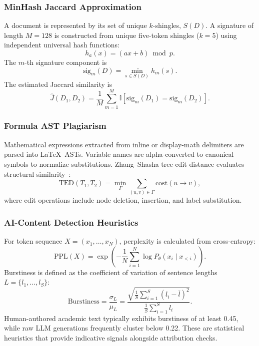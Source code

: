 \documentclass[conference]{IEEEtran}
\begin{document}
\subsubsection{MinHash Jaccard Approximation}
A document is represented by its set of unique $k$-shingles, $S(D)$. A signature of length $M = 128$ is constructed from unique five-token shingles ($k = 5$) using independent universal hash functions:
\begin{equation}
h_a(x) = (ax + b) \bmod p.
\label{eq:universal}
\end{equation}
The $m$-th signature component is
\begin{equation}
\mathrm{sig}_m(D) = \min_{s \in S(D)} h_m(s).
\label{eq:minhash}
\end{equation}
The estimated Jaccard similarity is
\begin{equation}
\widehat{J}(D_1, D_2) = \frac{1}{M} \sum_{m=1}^{M} \mathbb{I}[\mathrm{sig}_m(D_1) = \mathrm{sig}_m(D_2)].
\label{eq:jaccard}
\end{equation}

\subsubsection{Formula AST Plagiarism}
Mathematical expressions extracted from inline or display-math delimiters are parsed into \LaTeX\ ASTs. Variable names are alpha-converted to canonical symbols to normalize substitutions. Zhang--Shasha tree-edit distance evaluates structural similarity~\cite{zhang1989tree}:
\begin{equation}
\mathrm{TED}(T_1, T_2) = \min_{\Gamma} \sum_{(u,v) \in \Gamma} \mathrm{cost}(u \to v),
\label{eq:ted}
\end{equation}
where edit operations include node deletion, insertion, and label substitution.

\subsubsection{AI-Content Detection Heuristics}
For token sequence $X = (x_1, \ldots, x_N)$, perplexity is calculated from cross-entropy:
\begin{equation}
\mathrm{PPL}(X) = \exp\left( -\frac{1}{N} \sum_{i=1}^{N} \log P_\theta(x_i \mid x_{<i}) \right).
\label{eq:ppl}
\end{equation}
Burstiness is defined as the coefficient of variation of sentence lengths $L = \{l_1, \ldots, l_S\}$:
\begin{equation}
\mathrm{Burstiness} = \frac{\sigma_L}{\mu_L} = \frac{\sqrt{\frac{1}{S} \sum_{i=1}^{S} (l_i - \bar{l})^2}}{\frac{1}{S} \sum_{i=1}^{S} l_i}.
\label{eq:burst}
\end{equation}
Human-authored academic text typically exhibits burstiness of at least 0.45, while raw LLM generations frequently cluster below 0.22. These are statistical heuristics that provide indicative signals alongside attribution checks.
\end{document}
